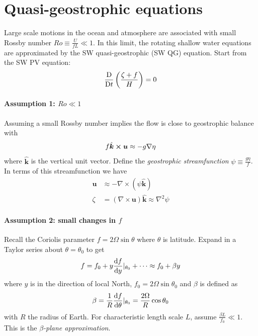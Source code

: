 \documentclass{jknotes}
\newcommand{\Ro}{Ro}
\begin{document}
\section{Quasi-geostrophic equations}
Large scale motions in the ocean and atmosphere are associated with small
Rossby number $\Ro \equiv \frac{U}{fL} \ll 1$. In this limit, the rotating
shallow water equations are approximated by the SW quasi-geostrophic (SW QG)
equation. Start from the SW PV equation:
\begin{equation}
	\frac{\mathrm{D}}{\mathrm{D} t}\left(\frac{\zeta + f}{H}\right) =
	0\label{eq:PVcons2}
\end{equation}

\paragraph{Assumption 1: $\Ro \ll 1$}
Assuming a small Rossby number implies the flow is close to geostrophic
balance with
\begin{equation}
	f \hat{\bm{k}} \cross \bm{u} \approx -g \nabla \eta
\end{equation}
where $\hat{\bm{k}}$ is the vertical unit vector. Define the \emph{geostrophic
streamfunction} $\psi \equiv \frac{g \eta}{f}$. In terms of this
streamfunction we have
\begin{align}
	\bm{u} &\approx - \nabla \times (\psi \hat{\bm{k}}) \\
	\zeta &= (\nabla \times \bm{u})\hat{\bm{k}} \approx \nabla^2 \psi
\end{align}

\paragraph{Assumption 2: small changes in $f$}
Recall the Coriolis parameter $f = 2 \Omega \sin \theta$ where $\theta$ is
latitude. Expand in a Taylor series about $\theta = \theta_0$ to get
\begin{equation}
	f = f_0 + y \frac{\diffd f}{\diffd y}\vert_{\theta_0} + \dots \approx f_0
	+ \beta y
\end{equation}
where $y$ is in the direction of local North, $f_0 = 2\Omega \sin \theta_0$
and $\beta$ is defined as
\begin{equation}
	\beta = \frac{1}{R} \frac{\diffd f}{\diffd \theta}\vert_{\theta_0} =
\frac{2\Omega}{R} \cos \theta_0\end{equation}
with $R$ the radius of Earth. For characteristic length scale $L$, assume
$\frac{\beta L}{f_0} \ll 1$. This is the \emph{$\beta$-plane approximation}.
\end{document}
